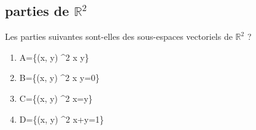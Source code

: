   \subsection{parties de $\mathbb{R}^2$}

    Les parties suivantes sont-elles des sous-espaces vectoriels de $\mathbb{R}^2$ ?
    \begin{enumerate}[i]
      \item A=\left\{(x, y) \in {}^2 \mid x \leqslant y\right\} \\
      \item B=\left\{(x, y) \in {}^2 \mid x y=0\right\} \\
      \item C=\left\{(x, y) \in {}^2 \mid x=y\right\} \\
      \item D=\left\{(x, y) \in {}^2 \mid x+y=1\right\}
    \end{enumerate}
    
